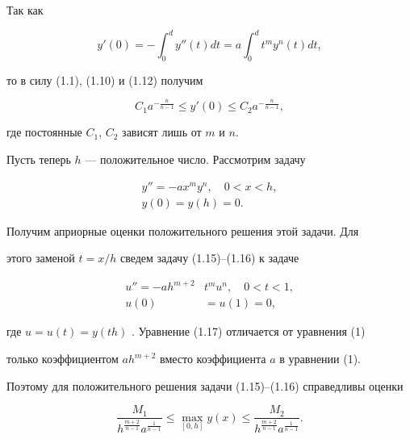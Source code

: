 Так как


$$


y'(0) = -\int_0^d y''(t)dt = a\int_0^d t^my^n(t)dt,


$$


то в силу (1.1), (1.10) и (1.12) получим


\begin{equation}


C_1a^{-\frac{n}{n-1}} \le y'(0) \le C_2a^{-\frac{n}{n-1}},


\end{equation}


где постоянные $C_1$, $C_2$ зависят лишь от $m$ и $n$.





Пусть теперь $h$ --- положительное число. Рассмотрим задачу


\begin{gather}


y'' = -ax^my^n,\quad 0 < x < h, \\


y(0) = y(h) = 0.


\end{gather}


Получим априорные оценки положительного решения этой задачи. Для


этого заменой $t = x/h$ сведем задачу (1.15)--(1.16) к задаче


\begin{equation}


\begin{split}


u''= -ah^{m+2}&t^mu^n,\quad 0 < t < 1, \\


u(0) &= u(1) = 0,


\end{split}


\end{equation}


где $u = u(t) = y(th)$ . Уравнение (1.17) отличается от уравнения (1)


только коэффициентом $ah^{m+2}$ вместо коэффициента $a$ в уравнении (1).


Поэтому для положительного решения задачи (1.15)--(1.16) справедливы оценки


\begin{equation}


\frac{M_1}{h^{\frac{m+2}{n-1}}a^{\frac{1}{n-1}}} \le


\max_{[0, h]}y(x) \le \frac{M_2}{h^


{\frac{m+2}{n-1}}a^{\frac{1}{n-1}}}.


\end{equation}


